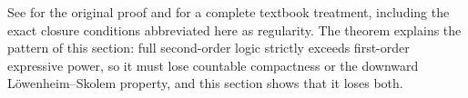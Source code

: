 See \cite{Lindstrom1969} for the original proof and
\cite[Chapter~XIII]{EbbinghausFlumThomas1994} for a complete textbook
treatment, including the exact closure conditions abbreviated here as
regularity.  The theorem explains the pattern of this section: full
second-order logic strictly exceeds first-order expressive power, so it
must lose countable compactness or the downward L\"owenheim--Skolem
property, and this section shows that it loses both.

